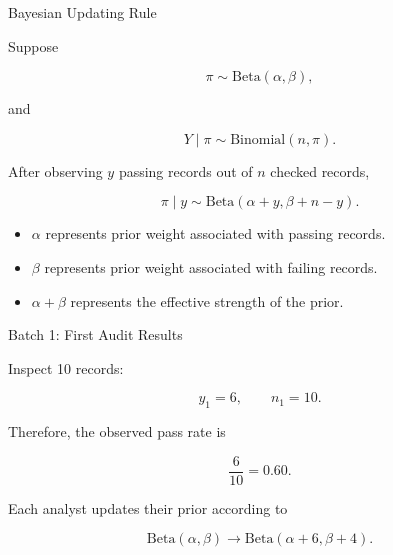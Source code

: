 \begin{frame}{Bayesian Updating Rule}

Suppose

\[
\pi \sim \mathrm{Beta}(\alpha,\beta),
\]

and

\[
Y \mid \pi \sim \mathrm{Binomial}(n,\pi).
\]

After observing $y$ passing records out of $n$ checked records,

\[
\pi \mid y
\sim
\mathrm{Beta}(\alpha+y,\beta+n-y).
\]

\vspace{0.3cm}

\begin{itemize}
  \item $\alpha$ represents prior weight associated with passing records.
  \item $\beta$ represents prior weight associated with failing records.
  \item $\alpha+\beta$ represents the effective strength of the prior.
\end{itemize}

\end{frame}

\begin{frame}{Batch 1: First Audit Results}

Inspect 10 records:

\[
y_1 = 6,
\qquad
n_1 = 10.
\]

Therefore, the observed pass rate is

\[
\frac{6}{10}=0.60.
\]

\vspace{0.4cm}

Each analyst updates their prior according to

\[
\mathrm{Beta}(\alpha,\beta)
\longrightarrow
\mathrm{Beta}(\alpha+6,\beta+4).
\]

\end{frame}

